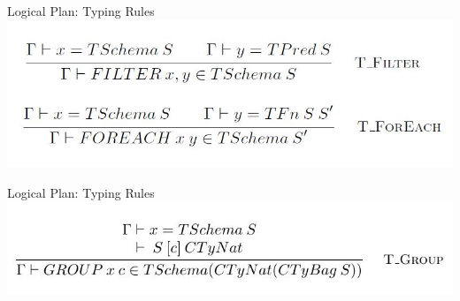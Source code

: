 \begin{frame}{Logical Plan: Typing Rules}
\centering
\includegraphics[scale=0.5]{Images/TypingRules/FilterForeach.JPG}
\end{frame}

\begin{frame}{Logical Plan: Typing Rules}
\centering
\includegraphics[scale=0.5]{Images/TypingRules/Group.JPG}
\end{frame}

